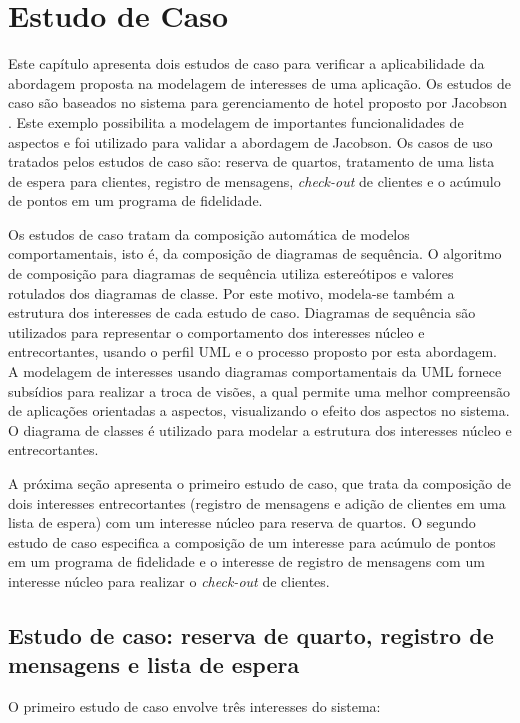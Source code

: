 \chapter{Estudo de Caso}\label{case_study}

Este capítulo apresenta dois estudos de caso para verificar a aplicabilidade da abordagem proposta na modelagem de interesses de uma aplicação. Os
estudos de caso são baseados no sistema para gerenciamento de hotel proposto por Jacobson \cite{Jacobson:2004:ASD:1062430}. Este exemplo possibilita a
modelagem de importantes funcionalidades de aspectos e foi utilizado para validar a abordagem de Jacobson. Os casos de uso tratados pelos
estudos de caso são: reserva de quartos, tratamento de uma lista de espera para clientes, registro de mensagens, \textit{check-out} de clientes e o
acúmulo de pontos em um programa de fidelidade. 

Os estudos de caso tratam da composição automática de modelos comportamentais, isto é, da composição de diagramas de sequência. O algoritmo de
composição para diagramas de sequência utiliza estereótipos e valores rotulados dos diagramas de classe. Por este motivo, modela-se também a
estrutura dos interesses de cada estudo de caso. Diagramas de sequência são utilizados para representar o comportamento dos interesses núcleo e
entrecortantes, usando o perfil UML e o processo proposto por esta abordagem. A modelagem de interesses usando diagramas comportamentais da UML 
fornece subsídios para realizar a troca de visões, a qual permite uma melhor compreensão de aplicações orientadas a aspectos, visualizando o efeito 
dos aspectos no sistema. O diagrama de classes é utilizado para modelar a estrutura dos interesses núcleo e entrecortantes.

A próxima seção apresenta o primeiro estudo de caso, que trata da composição de dois interesses entrecortantes (registro de mensagens e adição de
clientes em uma lista de espera) com um interesse núcleo para reserva de quartos. O segundo estudo de caso especifica a composição de um interesse
para acúmulo de pontos em um programa de fidelidade e o interesse de registro de mensagens com um interesse núcleo para realizar o \textit{check-out}
de clientes.

\section{Estudo de caso: reserva de quarto, registro de mensagens e lista de espera}

O primeiro estudo de caso envolve três interesses do sistema:

